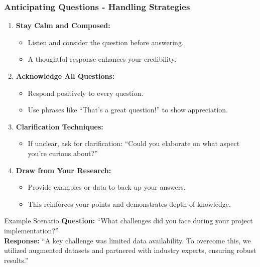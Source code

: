 \documentclass[aspectratio=169]{beamer}
\begin{document}
\begin{frame}[fragile]
    \frametitle{Anticipating Questions - Handling Strategies}
    \begin{enumerate}
        \item \textbf{Stay Calm and Composed:}
        \begin{itemize}
            \item Listen and consider the question before answering.
            \item A thoughtful response enhances your credibility.
        \end{itemize}
        
        \item \textbf{Acknowledge All Questions:}
        \begin{itemize}
            \item Respond positively to every question.
            \item Use phrases like ``That's a great question!'' to show appreciation.
        \end{itemize}
        
        \item \textbf{Clarification Techniques:}
        \begin{itemize}
            \item If unclear, ask for clarification: ``Could you elaborate on what aspect you're curious about?''
        \end{itemize}

        \item \textbf{Draw from Your Research:}
        \begin{itemize}
            \item Provide examples or data to back up your answers.
            \item This reinforces your points and demonstrates depth of knowledge.
        \end{itemize}
    \end{enumerate}
    
    \begin{block}{Example Scenario}
        \textbf{Question:} ``What challenges did you face during your project implementation?'' \\
        \textbf{Response:} ``A key challenge was limited data availability. To overcome this, we utilized augmented datasets and partnered with industry experts, ensuring robust results.''
    \end{block}
\end{frame}
\end{document}
